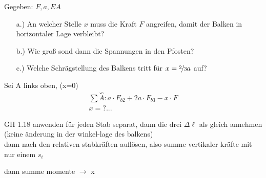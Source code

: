 Gegeben: $F, a, EA$

\begin{itemize}
\item[a.)]
  An welcher Stelle $x$ muss die Kraft $F$ angreifen, damit der Balken in horizontaler Lage verbleibt?

  \item[b.)]
    Wie groß sond dann die Spannungen in den Pfosten?

  \item[c.)]
    Welche Schrägstellung des Balkens tritt für $x = \nicefrac{2}{3}a$ auf?  
\end{itemize}

Sei A links oben, (x=0)
\begin{equation*}
  \begin{split}
    \sum \stackrel{\curvearrowleft}{A} \colon  a \cdot F_{b2}  + 2a \cdot F_{b3} - x \cdot F\\
    x = ?...
  \end{split}
\end{equation*}


GH 1.18 anwenden für jeden Stab separat, dann die drei $\Delta \ell$ als gleich annehmen (keine änderung in der winkel-lage des balkens)\\

dann nach den relativen stabkräften auflösen, also summe vertikaler kräfte mit nur einem $s_i$

dann summe momente $\rightarrow$ x
